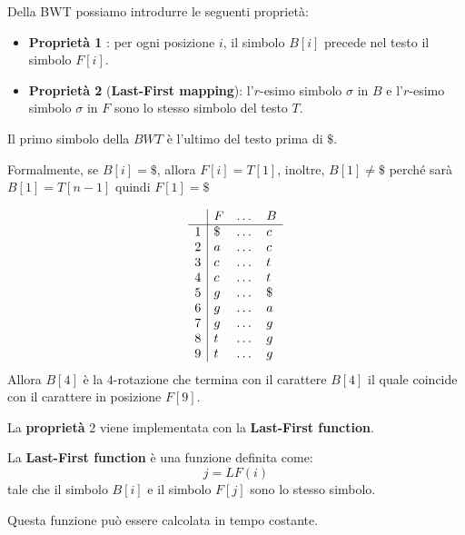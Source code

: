 Della BWT possiamo introdurre le seguenti proprietà:
\begin{itemize}
    \item \textbf{Proprietà 1} \label{proprietà-1}: per ogni posizione $i$, il
          simbolo $B[i]$ precede nel testo il simbolo $F[i]$.
    \item \textbf{Proprietà 2} \label{lfmapping} (\textbf{Last-First mapping}):
          l'$r$-esimo simbolo $\sigma$ in $B$ e l'$r$-esimo simbolo $\sigma$ in
          $F$ sono lo stesso simbolo del testo $T$.
\end{itemize}
\begin{nota}
    Il primo simbolo della $BWT$ è l'ultimo del testo prima di $\$$.

    Formalmente, se $B[i] = \$$, allora $F[i] = T[1]$, inoltre,
    $B[1] \neq \$$ perché sarà $B[1] = T[n - 1] $ quindi $F[1] = \$$
\end{nota}
\begin{esempio}
    \begin{equation}
        \begin{array}{l|l c l}
              & F  & \dots & B  \\
            \hline
            1 & \$ & \dots & c  \\
            2 & a  & \dots & c  \\
            3 & c  & \dots & t  \\
            4 & c  & \dots & t  \\
            5 & g  & \dots & \$ \\
            6 & g  & \dots & a  \\
            7 & g  & \dots & g  \\
            8 & t  & \dots & g  \\
            9 & t  & \dots & g  \\
        \end{array}
    \end{equation}
    Allora $B[4]$ è la $4$-rotazione che termina con il carattere $B[4]$ il quale
    coincide con il carattere in posizione $F[9]$.
\end{esempio}
La \textbf{proprietà} $2$ viene implementata con la \textbf{Last-First function}.
\begin{definizione}
    La \textbf{Last-First function} è una funzione definita come:
    \begin{equation}
        j = LF(i)
    \end{equation}
    tale che il simbolo $B[i]$ e il simbolo $F[j]$ sono lo stesso simbolo.
\end{definizione}
Questa funzione può essere calcolata in tempo costante.

